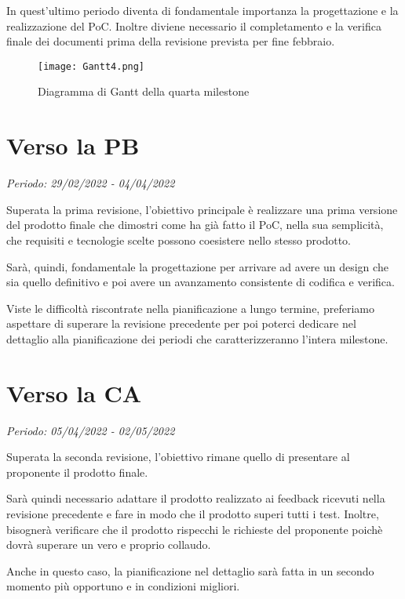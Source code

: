 In quest'ultimo periodo diventa di fondamentale importanza la progettazione e la realizzazione
 del PoC. Inoltre diviene necessario il completamento e la verifica finale dei documenti prima della revisione prevista 
 per fine febbraio.


\begin{figure}[!ht]
    \texttt{[image: Gantt4.png]}
    \caption{Diagramma di Gantt della quarta milestone} 
\end{figure}

\section{Verso la PB}

\textit{Periodo: 29/02/2022 - 04/04/2022}

Superata la prima revisione, l'obiettivo principale è realizzare una prima versione del prodotto finale che dimostri come ha già fatto il PoC, nella sua semplicità, 
che requisiti e tecnologie scelte possono coesistere nello stesso prodotto. 

Sarà, quindi, fondamentale la progettazione per arrivare ad avere un design che sia quello definitivo e poi avere un avanzamento consistente di codifica e verifica.

Viste le difficoltà riscontrate nella pianificazione a lungo termine, preferiamo aspettare di superare la revisione precedente per poi poterci dedicare nel dettaglio
alla pianificazione dei periodi che caratterizzeranno l'intera milestone.

\section{Verso la CA}

\textit{Periodo: 05/04/2022 - 02/05/2022}

Superata la seconda revisione, l'obiettivo rimane quello di presentare al proponente il prodotto finale.

Sarà quindi necessario adattare il prodotto realizzato ai feedback ricevuti nella revisione precedente e fare in modo che il prodotto superi tutti i test. Inoltre, bisognerà
verificare che il prodotto rispecchi le richieste del proponente poichè dovrà superare un vero e proprio collaudo.

Anche in questo caso, la pianificazione nel dettaglio sarà fatta in un secondo momento più opportuno e in condizioni migliori.